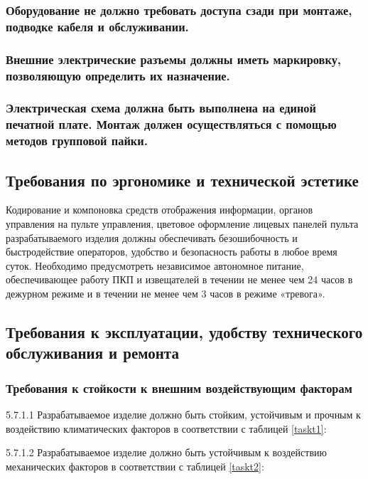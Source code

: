 					\subsubsection{Оборудование не должно требовать доступа сзади при монтаже, подводке кабеля и обслуживании.}
					\subsubsection{Внешние электрические разъемы должны иметь маркировку, позволяющую определить их назначение.}
					\subsubsection{Электрическая схема должна быть выполнена на единой печатной плате. Монтаж должен осуществляться с помощью методов групповой пайки.}
		\subsection{Требования по эргономике и технической эстетике}
			Кодирование и компоновка средств отображения информации, органов управления на пульте управления, цветовое оформление лицевых панелей пульта разрабатываемого изделия должны обеспечивать безошибочность и быстродействие операторов, удобство и безопасность работы в любое время суток.  Необходимо предусмотреть независимое автономное питание, обеспечивающее работу ПКП и извещателей в течении не менее чем 24 часов в дежурном режиме и в течении не менее чем 3 часов в режиме «тревога».
		\subsection{Требования к эксплуатации, удобству технического обслуживания и ремонта}
			\subsubsection{Требования к стойкости к внешним воздействующим факторам}
				5.7.1.1 Разрабатываемое изделие должно быть стойким, устойчивым и прочным к воздействию климатических факторов в соответствии с таблицей \ref{taskt1}:
				

				5.7.1.2 Разрабатываемое изделие должно быть устойчивым к воздействию механических факторов в соответствии с таблицей \ref{taskt2}:
				

